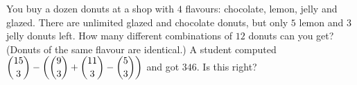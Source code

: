 You buy a dozen donuts at a shop with $4$ flavours: chocolate, lemon, jelly and glazed. There are unlimited glazed and chocolate donuts, but only $5$ lemon and $3$ jelly donuts left. How many different combinations of $12$ donuts can you get? (Donuts of the same flavour are identical.) A student computed $\dbinom{15}{3}-\left(\dbinom93+\dbinom{11}3-\dbinom53\right)$ and got $346$. Is this right?
